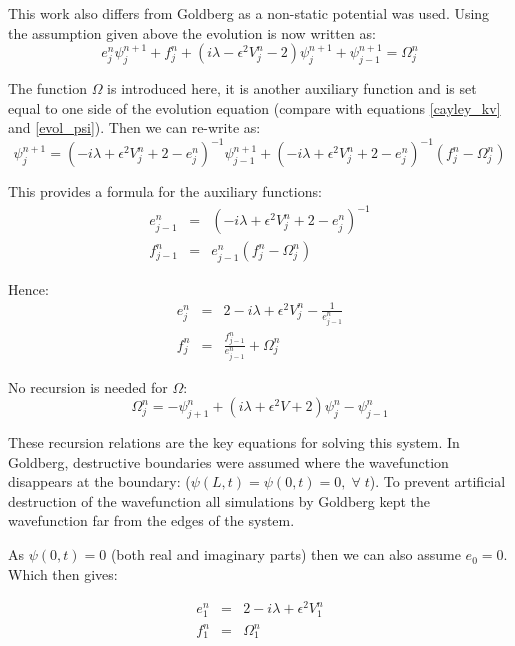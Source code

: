 This work also differs from Goldberg as a non-static potential was used. Using the assumption given above the evolution is now written as:
\begin{equation}
e_j^n \psi_{j}^{n+1} + f_j^n + (i\lambda - \epsilon^2 V_{j}^{n} -2) \psi_{j}^{n+1} + \psi_{j-1}^{n+1} = \Omega_j^n
\end{equation}

\noindent The function $\Omega$ is introduced here, it is another auxiliary function and is set equal to one side of the evolution equation (compare with equations \ref{cayley_kv} and \ref{evol_psi}). Then we can re-write as:
\begin{equation}
\psi_{j}^{n+1} = (-i\lambda +\epsilon^2 V_{j}^{n} +2 -e^n_j)^{-1} \psi_{j-1}^{n+1} +  (-i\lambda +\epsilon^2 V_{j}^{n} +2 -e^n_j)^{-1} (f_j^n - \Omega_j^n)
\end{equation}

\noindent This provides a formula for the auxiliary functions:
\begin{eqnarray}
e_{j-1}^n &=& (-i\lambda +\epsilon^2 V_{j}^{n} +2 -e^n_j)^{-1} \nonumber \\
f_{j-1}^n &=& e_{j-1}^n (f_j^n - \Omega_j^n)
\end{eqnarray}

\noindent Hence:
\begin{eqnarray}
e_{j}^n &=& 2 -i\lambda +\epsilon^2 V_{j}^{n} - \frac{1}{e_{j-1}^n} \nonumber \\
f_{j}^n &=& \frac{f_{j-1}^n}{e_{j-1}^n} + \Omega_j^n
\end{eqnarray}

\noindent No recursion is needed for $\Omega$:
\begin{equation}
\label{g_omega}
\Omega_j^n = -\psi_{j+1}^{n} + (i\lambda + \epsilon^2 V +2)\psi_{j}^{n} -\psi_{j-1}^{n}
\end{equation}

\noindent These recursion relations are the key equations for solving this system. In Goldberg, destructive boundaries were assumed where the wavefunction disappears at the boundary: ($\psi(L,t) = \psi(0,t) = 0, \; \forall \; t$). To prevent artificial destruction of the wavefunction all simulations by Goldberg kept the wavefunction far from the edges of the system.

As $\psi(0,t) = 0$ (both real and imaginary parts) then we can also assume $e_0 = 0$. Which then gives:

\begin{eqnarray}
e_{1}^n &=& 2 -i\lambda +\epsilon^2 V_{1}^{n} \nonumber \\
f_{1}^n &=& \Omega_1^n
\end{eqnarray}

